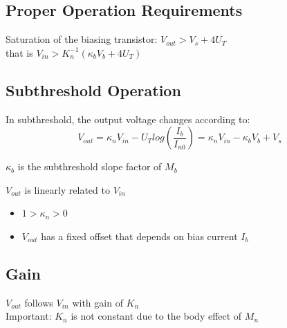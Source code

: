 \documentclass[report]{subfiles}
\begin{document}
\subsection{Proper Operation Requirements}
Saturation of the biasing transistor: $V_{out} > V_s + 4U_T$\\
that is $V_{in} > K_{n}^{-1}(\kappa_b V_b + 4U_T)$

\subsection{Subthreshold Operation}
In subthreshold, the output voltage changes according to:
\begin{equation}
V_{out}=\kappa_n V_{in} - U_T log(\frac{I_b}{I_{n0}}) = \kappa_n V_{in} - \kappa_b V_b + V_s
\end{equation}
\begin{center}
$\kappa_b$ is the subthreshold slope factor of $M_b$\\
\end{center}
$V_{out}$ is linearly related to $V_{in}$
\begin{itemize}[label={}]
\item $1 >\kappa_n >0$
\item $V_{out}$ has a fixed offset that depends on bias current $I_b$
\end{itemize}

\subsection{Gain}
$V_{out}$ follows $V_{in}$ with gain of $K_n$\\
Important: $K_n$ is not constant due to the body effect of $M_n$

\end{document}
